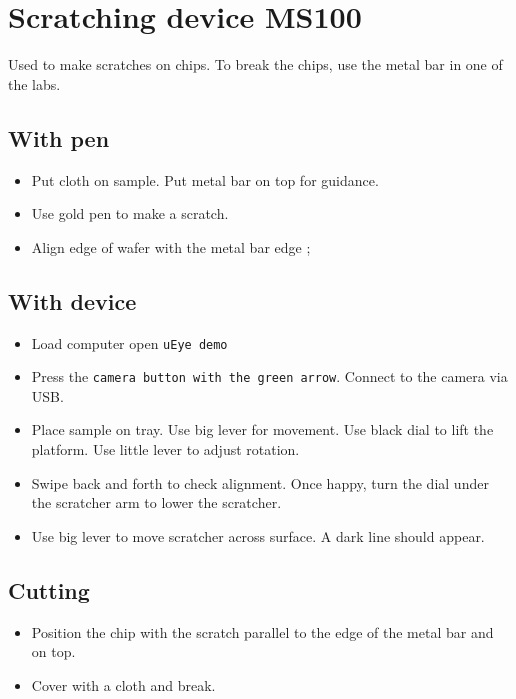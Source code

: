 \section{Scratching device MS100}
  Used to make scratches on chips. To break the chips, use the metal bar in one of the labs. 
  
  \subsection{With pen}
  \begin{itemize}
  	\item Put cloth on sample. Put metal bar on top for guidance.
  	\item Use gold pen to make a scratch.
  	\item Align edge of wafer with the metal bar edge \ira {};
  \end{itemize}

  \subsection{With device}
  \begin{itemize}
  	\item Load computer open \texttt{uEye demo}
  	\item Press the \texttt{camera button with the green arrow}. Connect to the camera via USB.
  	\item Place sample on tray. Use big lever for movement. Use black dial to lift the platform. Use little lever to adjust rotation.
  	\item Swipe back and forth to check alignment. Once happy, turn the dial under the scratcher arm to lower the scratcher.
  	\item Use big lever to move scratcher across surface. A dark line should appear.
  \end{itemize}

  
  \subsection{Cutting}
  \begin{itemize}
  	\item Position the chip with the scratch parallel to the edge of the metal bar and on top.
  	\item Cover with a cloth and break.
  \end{itemize}
 
 
 \newpage
 